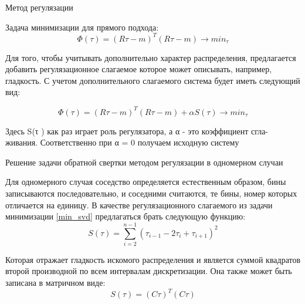 \documentclass[fullscreen=true,russian,compress,%
	hyperref={unicode,bookmarks=false}]{presentation}
\begin{document}
\begin{frame}{Метод регулязации}
\begin{block}{}
   Задача минимизации для прямого подхода:
   \begin{equation}
      \Phi(\tau)=(R\tau-m)^T (R\tau-m) \to min_{\tau}
      \label{min_base}
   \end{equation}
\end{block}
\begin{block}{}
   Для того, чтобы учитывать дополнительно характер распределения, предлагается добавить регулязационное слагаемое  
   которое может описывать, например, гладкость. С учетом дополнительного слагаемого система будет иметь следующий вид: 

   \begin{equation}
      \Phi(\tau)=(R\tau-m)^T (R\tau-m) + \alpha S(\tau) \to min_{\tau}
      \label{min_svd}
   \end{equation}

   Здесь S(τ ) как раз играет роль регулязатора, а α - это коэффициент сгла-
   живания. Соответственно при α = 0 получаем исходную систему
\end{block}
\end{frame}


\begin{frame}{Решение задачи обратной свертки методом регулязации в одномерном случаи}

Для одномерного случая соседство определяется естественным образом, бины записываются последовательно, и соседними считаются, те бины, номер 
которых отличается на единицу. В качестве регулязационного слагаемого из задачи минимизации \eqref{min_svd} предлагаться брать следующую функцию:
\begin{equation}
    S(\tau)= \sum_{i=2}^{n-1} (\tau_{i-1} - 2\tau_{i} + \tau_{i+1})^2
\end{equation}

Которая отражает гладкость искомого распределения и является суммой квадратов второй производной по всем интервалам дискретизации. 
Она также может быть записана в матричном виде:
\begin{equation}
    S(\tau) = (C\tau)^T(C\tau)
\end{equation}
\end{frame}
\end{document}
